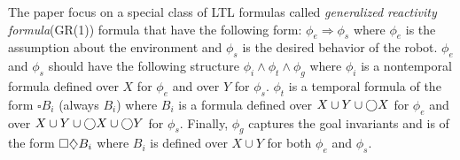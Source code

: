The paper focus on a special class of LTL formulas called \emph{generalized reactivity formula}(GR(1)) formula
that have the following form: $\phi_e \Rightarrow \phi_s$  where $\phi_e$ is the assumption
about the environment and $\phi_s$ is the desired behavior of the robot.
$\phi_e$ and $\phi_s$ should have the following structure $\phi_i \wedge \phi_t \wedge \phi_g$ where
$\phi_i$ is a nontemporal formula defined over $X$ for $\phi_e$ and over $Y$ for $\phi_s$. 
$\phi_t$ is a temporal formula of the form $\square B_i$ (always $B_i$) where $B_i$ is a formula 
defined over $X \cup Y \cup \bigcirc X$ for $\phi_e$ and over $X \cup Y \cup \bigcirc X \cup \bigcirc Y$ for
$\phi_s$. Finally, $\phi_g$ captures the goal invariants and is of the form $\square \diamondsuit B_i$
where $B_i$ is defined over $X \cup Y$ for both $\phi_e$ and $\phi_s$.


